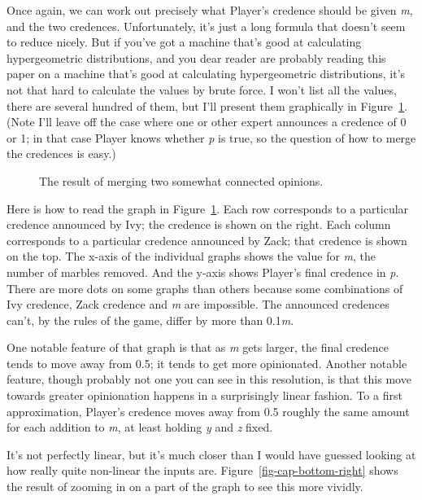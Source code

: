 \documentclass[
  10pt,
  letterpaper,
  DIV=11,
  numbers=noendperiod,
  twoside]{scrartcl}
\begin{document}
Once again, we can work out precisely what Player's credence should be
given \emph{m}, and the two credences. Unfortunately, it's just a long
formula that doesn't seem to reduce nicely. But if you've got a machine
that's good at calculating hypergeometric distributions, and you dear
reader are probably reading this paper on a machine that's good at
calculating hypergeometric distributions, it's not that hard to
calculate the values by brute force. I won't list all the values, there
are several hundred of them, but I'll present them graphically in
Figure~\ref{fig-conexp}. (Note I'll leave off the case where one or
other expert announces a credence of 0 or 1; in that case Player knows
whether \emph{p} is true, so the question of how to merge the credences
is easy.)

\begin{figure}


\caption{\label{fig-conexp}The result of merging two somewhat connected
opinions.}

\end{figure}%

Here is how to read the graph in Figure~\ref{fig-conexp}. Each row
corresponds to a particular credence announced by Ivy; the credence is
shown on the right. Each column corresponds to a particular credence
announced by Zack; that credence is shown on the top. The x-axis of the
individual graphs shows the value for \emph{m}, the number of marbles
removed. And the y-axis shows Player's final credence in \emph{p}. There
are more dots on some graphs than others because some combinations of
Ivy credence, Zack credence and \emph{m} are impossible. The announced
credences can't, by the rules of the game, differ by more than
0.1\emph{m}.

One notable feature of that graph is that as \emph{m} gets larger, the
final credence tends to move away from 0.5; it tends to get more
opinionated. Another notable feature, though probably not one you can
see in this resolution, is that this move towards greater opinionation
happens in a surprisingly linear fashion. To a first approximation,
Player's credence moves away from 0.5 roughly the same amount for each
addition to \emph{m}, at least holding \emph{y} and \emph{z} fixed.

It's not perfectly linear, but it's much closer than I would have
guessed looking at how really quite non-linear the inputs are.
Figure~\ref{fig-cap-bottom-right} shows the result of zooming in on a
part of the graph to see this more vividly.
\end{document}
